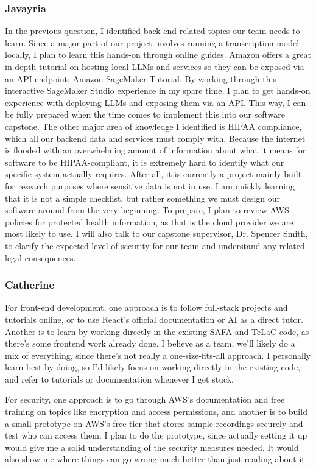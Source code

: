 \documentclass[12pt]{article}
\begin{document}
\subsubsection*{Javayria}
In the previous question, I identified back-end related topics our team needs to learn. Since a major part of our project involves running a transcription model locally, I plan to learn this hands-on through online guides. Amazon offers a great in-depth tutorial on hosting local LLMs and services so they can be exposed via an API endpoint: Amazon SageMaker Tutorial. By working through this interactive SageMaker Studio experience in my spare time, I plan to get hands-on experience with deploying LLMs and exposing them via an API. This way, I can be fully prepared when the time comes to implement this into our software capstone.
The other major area of knowledge I identified is HIPAA compliance, which all our backend data and services must comply with. Because the internet is flooded with an overwhelming amount of information about what it means for software to be HIPAA-compliant, it is extremely hard to identify what our specific system actually requires. After all, it is currently a project mainly built for research purposes where sensitive data is not in use. I am quickly learning that it is not a simple checklist, but rather something we must design our software around from the very beginning. To prepare, I plan to review AWS policies for protected health information, as that is the cloud provider we are most likely to use. I will also talk to our capstone supervisor, Dr. Spencer Smith, to clarify the expected level of security for our team and understand any related legal consequences.

\subsubsection*{Catherine}
For front-end development, one approach is to follow full-stack projects and tutorials
online, or to use React's official documentation or AI as a direct tutor. Another is to learn by working directly 
in the existing SAFA and TeLaC code, as there's some frontend work already done. I believe as a team, we'll likely
do a mix of everything, since there's not really a one-size-fits-all approach. I personally learn best by doing, so I'd likely focus on working directly in the existing
code, and refer to tutorials or documentation whenever I get stuck.

For security, one approach is to go through AWS's documentation and free training on
topics like encryption and access permissions, and another is to build a small
prototype on AWS's free tier that stores sample recordings securely and test who can
access them. I plan to do the prototype, since actually setting it up would give me
a solid understanding of the security measures needed. It would also show me where
things can go wrong much better than just reading about it.
\end{document}
